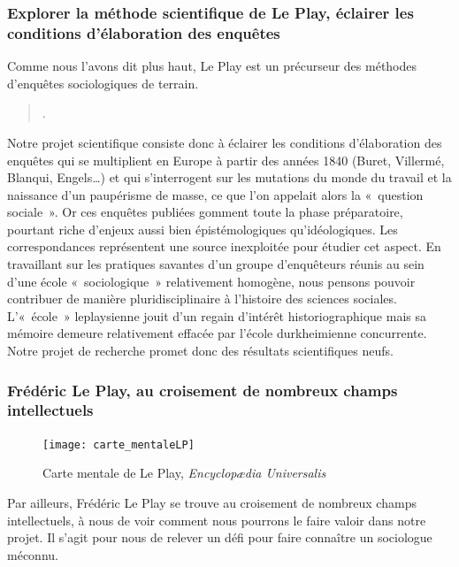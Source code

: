 \subsubsection{Explorer la méthode scientifique de Le Play, éclairer les conditions d’élaboration des enquêtes}
Comme nous l'avons dit plus haut, Le Play est un précurseur des méthodes d'enquêtes sociologiques de terrain. 
\begin{quote}
    .
\end{quote}

Notre projet scientifique consiste donc à éclairer les conditions d’élaboration des enquêtes qui se multiplient en Europe à partir des années 1840 (Buret, Villermé, Blanqui, Engels…) et qui s’interrogent sur les mutations du monde du travail et la naissance d’un paupérisme de masse, ce que l’on appelait alors la « question sociale ». Or ces enquêtes publiées gomment toute la phase préparatoire, pourtant riche d’enjeux aussi bien épistémologiques qu’idéologiques. Les correspondances représentent une source inexploitée pour étudier cet aspect. En travaillant sur les pratiques savantes d’un groupe d’enquêteurs réunis au sein d’une école « sociologique » relativement homogène, nous pensons pouvoir contribuer de manière pluridisciplinaire à l’histoire des sciences sociales. L’« école » leplaysienne jouit d’un regain d’intérêt historiographique mais sa mémoire demeure relativement effacée par l’école durkheimienne concurrente. Notre projet de recherche promet donc des résultats scientifiques neufs.

\subsubsection{Frédéric Le Play, au croisement de nombreux champs intellectuels}

\begin{figure}[ht]
    \centering
    \caption{Carte mentale de Le Play, \emph{Encyclopædia Universalis}}
    \texttt{[image: carte\_mentaleLP]}
    \label{carte_mentaleLP}
\end{figure}
Par ailleurs, Frédéric Le Play se trouve au croisement de nombreux champs intellectuels, à nous de voir comment nous pourrons le faire valoir dans notre projet. Il s'agit pour nous de relever un défi pour faire connaître un sociologue méconnu.



